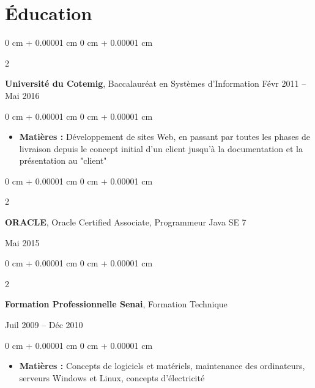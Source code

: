 \documentclass[10pt, letterpaper]{article}
\newenvironment{highlights}{
    \begin{itemize}[
        topsep=0.10 cm,
        parsep=0.10 cm,
        partopsep=0pt,
        itemsep=0pt,
        leftmargin=0 cm + 10pt
    ]
}{
    \end{itemize}
} %
\newenvironment{onecolentry}{
    \begin{adjustwidth}{
        0 cm + 0.00001 cm
    }{
        0 cm + 0.00001 cm
    }
}{
    \end{adjustwidth}
} %
\newenvironment{twocolentry}[2][]{
    \onecolentry
    \def\secondColumn{#2}
    \setcolumnwidth{\fill, 4.5 cm}
    \begin{paracol}{2}
}{
    \switchcolumn \raggedleft \secondColumn
    \end{paracol}
    \endonecolentry
} %
\begin{document}
        \vspace{0.2 cm}


    \section{Éducation}

        \begin{twocolentry}{
            Févr 2011 – Mai 2016
        }
            \textbf{Université du Cotemig}, Baccalauréat en Systèmes d'Information\end{twocolentry}

        \vspace{0.10 cm}

        \begin{onecolentry}
            \begin{highlights}
                \item \textbf{Matières :} Développement de sites Web, en passant par toutes les phases de livraison depuis le concept initial d'un client jusqu'à la documentation et la présentation au "client"
            \end{highlights}
        \end{onecolentry}

        \vspace{0.15 cm}
        \begin{twocolentry}{
            Mai 2015
        }
            \textbf{ORACLE}, Oracle Certified Associate, Programmeur Java SE 7
        \end{twocolentry}
            
        \vspace{0.15 cm}

        \begin{twocolentry}{
            Juil 2009 – Déc 2010
        }
            \textbf{Formation Professionnelle Senai}, Formation Technique
        \end{twocolentry}

        \vspace{0.10 cm}

        \begin{onecolentry}
            \begin{highlights}
                \item \textbf{Matières :} Concepts de logiciels et matériels, maintenance des ordinateurs, serveurs Windows et Linux, concepts d'électricité
            \end{highlights}
        \end{onecolentry}
\end{document}
